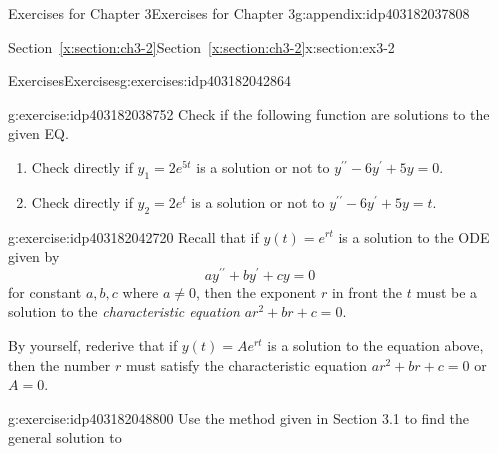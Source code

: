 \documentclass[oneside,10pt,]{book}
\newcommand{\xreffont}{\relax}
\numberwithin{equation}{section}
\numberwithin{equation}{section}
\begin{document}
%
%
\typeout{************************************************}
\typeout{************************************************}
%
\begin{appendixptx}{Exercises for Chapter 3}{}{Exercises for Chapter 3}{}{}{g:appendix:idp403182037808}
%
%
\typeout{************************************************}
\typeout{Section D.1 Section~{\xreffont\ref*{x:section:ch3-2}}}
\typeout{************************************************}
%
\begin{sectionptx}{Section~{\xreffont\ref*{x:section:ch3-2}}}{}{Section~{\xreffont\ref*{x:section:ch3-2}}}{}{}{x:section:ex3-2}
%
%
\typeout{************************************************}
\typeout{************************************************}
%
\begin{exercises-subsection-numberless}{Exercises}{}{Exercises}{}{}{g:exercises:idp403182042864}
\begin{divisionexercise}{1}{}{}{g:exercise:idp403182038752}%
Check if the following function are solutions to the given EQ.%
\begin{enumerate}[label=(\alph*)]
\item{}Check directly if \(y_{1}=2e^{5t}\) is a solution or not to \(y^{\prime\prime}-6y^{\prime}+5y=0\).%
\item{}Check directly if \(y_{2}=2e^{t}\) is a solution or not to \(y^{\prime\prime}-6y^{\prime}+5y=t\).%
\end{enumerate}
%
\end{divisionexercise}%
\begin{divisionexercise}{2}{}{}{g:exercise:idp403182042720}%
Recall that if \(y(t)=e^{rt}\) is a solution to the ODE given by%
\begin{equation*}
ay^{\prime\prime}+by^{\prime}+cy=0
\end{equation*}
for constant \(a,b,c\) where \(a\ne0\), then the exponent \(r\) in front the \(t\) must be a solution to the \emph{characteristic equation} \(ar^{2}+br+c=0\).%
\par
By yourself, rederive that if \(y(t)=Ae^{rt}\) is a solution to the equation above, then the number \(r\) must satisfy the characteristic equation \(ar^{2}+br+c=0\) or \(A=0\).%
\end{divisionexercise}%
\begin{divisionexercise}{3}{}{}{g:exercise:idp403182048800}%
Use the method given in Section 3.1 to find the general solution to%
\begin{equation*}

\end{equation*}
\end{divisionexercise}
\end{exercises-subsection-numberless}
\end{sectionptx}
\end{appendixptx}
\end{document}
